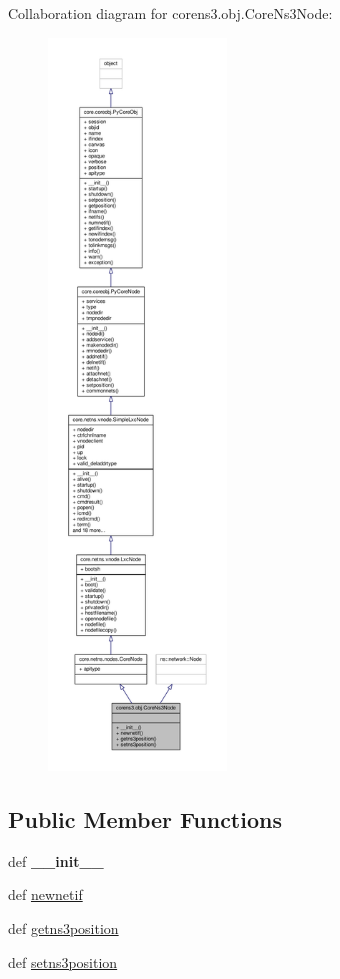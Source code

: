 Collaboration diagram for corens3.\+obj.\+Core\+Ns3\+Node\+:
\nopagebreak
\begin{figure}[H]
\begin{center}
\leavevmode
\includegraphics[height=550pt]{classcorens3_1_1obj_1_1_core_ns3_node__coll__graph}
\end{center}
\end{figure}
\subsection*{Public Member Functions}
\begin{DoxyCompactItemize}
\item 
\hypertarget{classcorens3_1_1obj_1_1_core_ns3_node_ab1d1b3862c49febd255578d1d4d2b084}{def {\bfseries \+\_\+\+\_\+init\+\_\+\+\_\+}}\label{classcorens3_1_1obj_1_1_core_ns3_node_ab1d1b3862c49febd255578d1d4d2b084}

\item 
def \hyperlink{classcorens3_1_1obj_1_1_core_ns3_node_a9c892c9793923f9cb0d7793df17b63ea}{newnetif}
\item 
def \hyperlink{classcorens3_1_1obj_1_1_core_ns3_node_a4e397c05798ffff1fa94b13587ad8321}{getns3position}
\item 
def \hyperlink{classcorens3_1_1obj_1_1_core_ns3_node_a5dd46991b5d18bcab27fa728ab2ca25d}{setns3position}
\end{DoxyCompactItemize}
